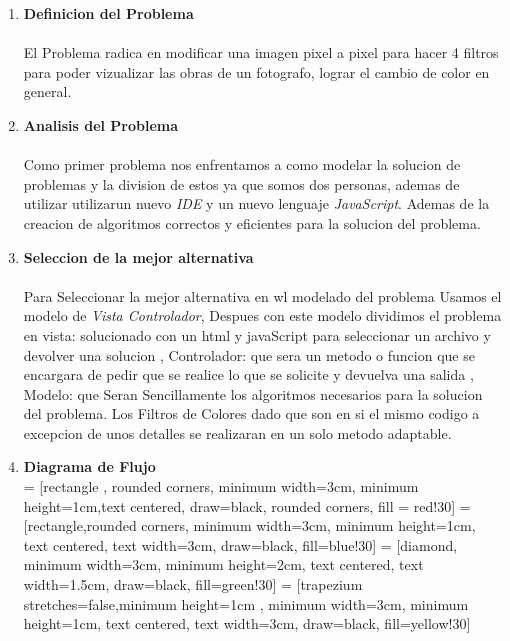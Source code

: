 \documentclass[10pt,letterpaper,fleqn]{article}
\begin{document}
    \begin{enumerate}
        
        \item {\Large \textbf{Definicion del Problema}}\\
        \\El Problema radica en  modificar una imagen pixel a pixel para hacer 4 filtros para poder vizualizar las obras de un fotografo, lograr el cambio de color en general.
        
        \vspace{2cm}
        \item {\Large \textbf{Analisis del Problema}}\\
        \\Como primer problema nos enfrentamos a como modelar la solucion de problemas y la division de estos ya que somos dos personas, ademas de utilizar utilizarun  nuevo \textit{IDE} y un nuevo lenguaje \textit{JavaScript}.
        Ademas de la creacion de algoritmos correctos y eficientes para la solucion del problema.
        
        \vspace{2cm}
        \item {\Large \textbf{Seleccion de la mejor alternativa}}\\
        \\Para Seleccionar la mejor alternativa en wl modelado del problema Usamos el modelo de \textit{Vista Controlador}, Despues con este modelo dividimos el problema en vista: solucionado con un html y javaScript para seleccionar un archivo y devolver una solucion , Controlador: que sera un metodo o funcion que se encargara de pedir que se realice lo que se solicite y devuelva una salida , Modelo: que Seran Sencillamente los algoritmos necesarios para la solucion del problema.
        Los Filtros de Colores dado que son en si el mismo codigo a excepcion de unos detalles se realizaran en un solo metodo adaptable.
        
        \vspace{2cm}
        \item {\Large \textbf{Diagrama de Flujo}}\\
         = [rectangle , rounded corners, minimum width=3cm, minimum height=1cm,text centered, draw=black, rounded corners, fill = red!30]
         = [rectangle,rounded corners, minimum width=3cm, minimum height=1cm, text centered, text width=3cm, draw=black, fill=blue!30]
         = [diamond, minimum width=3cm, minimum height=2cm, text centered, text width=1.5cm, draw=black, fill=green!30]
         = [trapezium stretches=false,minimum height=1cm , minimum width=3cm, minimum height=1cm, text centered, text width=3cm, draw=black, fill=yellow!30]
        


\end{enumerate}
\end{document}

